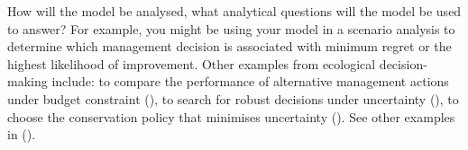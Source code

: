 \documentclass[
]{article}
\begin{document}
\begin{tcolorbox}[enhanced jigsaw, opacitybacktitle=0.6, bottomrule=.15mm, leftrule=.75mm, rightrule=.15mm, colbacktitle=quarto-callout-note-color!10!white, toprule=.15mm, titlerule=0mm, left=2mm, colframe=quarto-callout-note-color-frame, breakable, title=\textcolor{quarto-callout-note-color}{\faInfo}\hspace{0.5em}{Explanation}, opacityback=0, coltitle=black, bottomtitle=1mm, colback=white, toptitle=1mm, arc=.35mm]

How will the model be analysed, what analytical questions will the model
be used to answer? For example, you might be using your model in a
scenario analysis to determine which management decision is associated
with minimum regret or the highest likelihood of improvement. Other
examples from ecological decision-making include: to compare the
performance of alternative management actions under budget constraint
(), to search for
robust decisions under uncertainty
(), to
choose the conservation policy that minimises uncertainty
(). See other examples
in ().

\end{tcolorbox}
\end{document}

